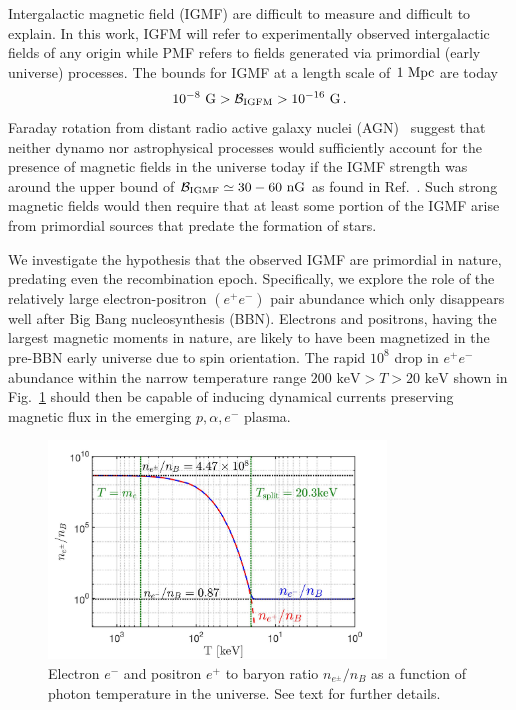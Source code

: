 \documentclass[reprint]{revtex4-2}
\newcommand*{\keV}{\text{ keV}}
\newcommand{\rf}[1]{Fig.~{\ref{#1}}}
\newcommand*{\xblue}{\color{black}}
\begin{document}
Intergalactic magnetic field (IGMF) are  difficult to measure and difficult to explain. {\xblue In this work, IGFM will refer to experimentally observed intergalactic fields of any origin while PMF refers to fields generated via primordial (early universe) processes.} The bounds for IGMF at a length scale of $1{\rm\ Mpc}$ are today~\cite{neronov2010evidence,taylor2011extragalactic,pshirkov2015new,jedamzik2019stringent,vernstrom2021discovery}
\begin{align}
    \label{igmf}
    10^{-8}{\rm\ G}>\mathcal{B}_{\rm IGFM}>10^{-16}{\rm\ G}\,.
\end{align}
Faraday rotation from distant radio active galaxy nuclei (AGN)~\cite{pomakov2022redshift} suggest that neither dynamo nor astrophysical processes would sufficiently account for the presence of magnetic fields in the universe today if the IGMF strength was around the upper bound of ${\cal B}_{\rm IGMF}\simeq30-60{\rm\ nG}$ as found in Ref.~\cite{vernstrom2021discovery}. Such strong magnetic fields would then require that at least some portion of the IGMF arise from primordial sources that predate the formation of stars.

We investigate the hypothesis that the observed  IGMF  are primordial in nature, predating even the recombination epoch. Specifically, we explore the role of the relatively large electron-positron $(e^{+}e^{-})$ pair abundance which only disappears well after Big Bang nucleosynthesis (BBN). {\xblue Electrons and positrons, having the largest magnetic moments in nature, are likely to have been magnetized in the pre-BBN early universe due to spin orientation. The rapid $10^{8}$ drop in $e^{+}e^{-}$ abundance within the narrow temperature range $200\keV>T>20\keV$ shown in \rf{fig:densityratio} should then be capable of inducing dynamical currents preserving magnetic flux} in the emerging $p,\alpha,e^-$ plasma.  
\begin{figure}[ht]
    \centering
    \includegraphics[width=0.8\textwidth]{plots/EEPlasmaDensityRatio_new.jpg}
    \caption{Electron $e^{-}$ and positron $e^{+}$ to baryon ratio $n_{e^{\pm}}/n_{B}$ as a function of photon temperature in the universe. See text for further details.}
    \label{fig:densityratio} 
\end{figure}
\end{document}
